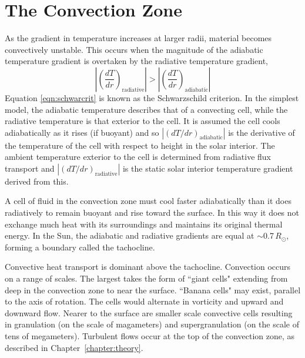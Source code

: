 \section{The Convection Zone}\label{sect:convzone}

As the gradient in temperature increases at larger radii, material becomes convectively unstable. This occurs when the magnitude of the adiabatic temperature gradient is overtaken by the radiative temperature gradient,
\begin{equation}\label{eqn:schwarcrit}
\left|\left(\frac{dT}{dr}\right)_{\mathrm{radiative}}\right|>\left|\left(\frac{dT}{dr}\right)_{\mathrm{adiabatic}}\right| %
\end{equation}
Equation \ref{eqn:schwarcrit} is known as the Schwarzschild criterion. In the simplest model, the adiabatic temperature describes that of a convecting cell, while the radiative temperature is that exterior to the cell. It is assumed the cell cools adiabatically as it rises (if buoyant) and so $\left|\left( dT/dr \right)_{\mathrm{adiabatic}}\right|$ is the derivative of the temperature of the cell with respect to height in the solar interior. The ambient temperature exterior to the cell is determined from radiative flux transport and $\left|\left( dT/dr \right)_{\mathrm{radiative}}\right|$ is the static solar interior temperature gradient derived from this.

A cell of fluid in the convection zone must cool faster adiabatically than it does radiatively to remain buoyant and rise toward the surface. In this way it does not exchange much heat with its surroundings and maintains its original thermal energy. In the Sun, the adiabatic and radiative gradients are equal at $\sim$0.7\,$R_{\odot}$, forming a boundary called the tachocline. 

Convective heat transport is dominant above the tachocline. Convection occurs on a range of scales. The largest takes the form of ``giant cells" extending from deep in the convection zone to near the surface. ``Banana cells" may exist, parallel to the axis of rotation. The cells would alternate in vorticity and upward and downward flow. Nearer to the surface are smaller scale convective cells resulting in granulation (on the scale of magameters) and supergranulation (on the scale of tens of megameters). Turbulent flows occur at the top of the convection zone, as described in Chapter~\ref{chapter:theory}.


